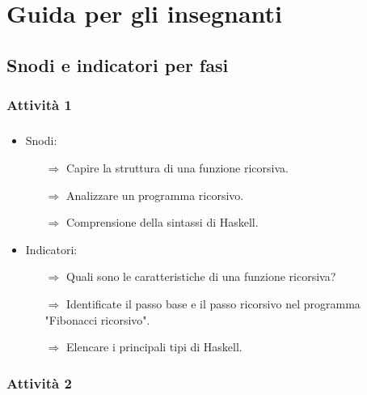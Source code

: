 \chapter{Guida per gli insegnanti}

\section{Snodi e indicatori per fasi}


\subsection{Attività 1}

\paragraph{}

\begin{itemize}
    \item Snodi:
    \begin{itemize}
        \item [$\Rightarrow$] Capire la struttura di una funzione ricorsiva.
        \item [$\Rightarrow$] Analizzare un programma ricorsivo.
        \item [$\Rightarrow$] Comprensione della sintassi di Haskell.
    \end{itemize}
    \item Indicatori:
    \begin{itemize}
        \item [$\Rightarrow$] Quali sono le caratteristiche di una funzione ricorsiva?
        \item [$\Rightarrow$] Identificate il passo base e il passo ricorsivo nel programma
                              "Fibonacci ricorsivo".
        \item [$\Rightarrow$] Elencare i principali tipi di Haskell.
    \end{itemize}
\end{itemize}

\subsection{Attività 2}

